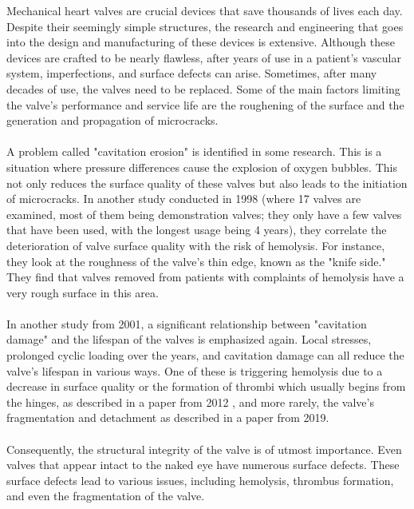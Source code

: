 Mechanical heart valves are crucial devices that save thousands of lives each day. Despite their seemingly simple structures, the research and engineering that goes into the design and manufacturing of these devices is extensive. Although these devices are crafted to be nearly flawless, after years of use in a patient's vascular system, imperfections, and surface defects can arise. Sometimes, after many decades of use, the valves need to be replaced. Some of the main factors limiting the valve's performance and service life are the roughening of the surface and the generation and propagation of microcracks. 
\\\\A problem called "cavitation erosion" is identified in some research.\cite*{zhang1995} \cite*{wu2001} This is a situation where pressure differences cause the explosion of oxygen bubbles. This not only reduces the surface quality of these valves but also leads to the initiation of microcracks. In another study conducted in 1998 \cite*{barmada1998} (where 17 valves are examined, most of them being demonstration valves; they only have a few valves that have been used, with the longest usage being 4 years), they correlate the deterioration of valve surface quality with the risk of hemolysis. For instance, they look at the roughness of the valve's thin edge, known as the "knife side." They find that valves removed from patients with complaints of hemolysis have a very rough surface in this area.
\\\\In another study from 2001, \cite*{wu2001} a significant relationship between "cavitation damage" and the lifespan of the valves is emphasized again. Local stresses, prolonged cyclic loading over the years, and cavitation damage can all reduce the valve's lifespan in various ways. One of these is triggering hemolysis due to a decrease in surface quality or the formation of thrombi which usually begins from the hinges, as described in a paper from 2012 \cite*{bonou2012}, and more rarely, the valve's fragmentation and detachment as described in a paper from 2019.\cite*{vansteenbergen2019}
\\\\Consequently, the structural integrity of the valve is of utmost importance. Even valves that appear intact to the naked eye have numerous surface defects. These surface defects lead to various issues, including hemolysis, thrombus formation, and even the fragmentation of the valve.
